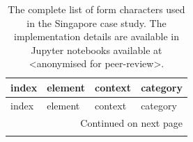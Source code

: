 \begin{longtable}{p{5cm}p{4cm}p{4cm}l}
    \caption{The complete list of form characters used in the Singapore case study. The implementation details are available
    in Jupyter notebooks available at <anonymised for peer-review>.}
    \label{tab:form_sin} \\
    \toprule
                                   index &                         element &                    context &     category \\
    \midrule
    \endfirsthead

    \toprule
                                   index &                         element &                    context &     category \\
    \midrule
    \endhead
    \midrule
    \multicolumn{4}{r}{{Continued on next page}} \\
    \midrule
    \endfoot


\end{longtable}
